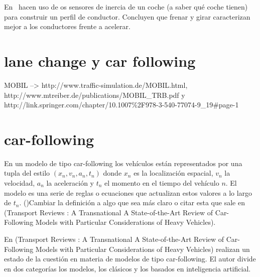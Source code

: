 En~\cite{van2013driver} hacen uso de os sensores de inercia de un coche (a saber qué coche tienen) para construir un perfil de conductor. Concluyen que frenar y girar caracterizan mejor a los conductores frente a acelerar.

\section{lane change y car following}

MOBIL --> http://www.traffic-simulation.de/MOBIL.html, http://www.mtreiber.de/publications/MOBIL\_TRB.pdf y http://link.springer.com/chapter/10.1007\%2F978-3-540-77074-9\_19\#page-1

\section{car-following}

En un modelo de tipo car-following los vehículos están representados por una tupla del estilo $(x_n, v_n, a_n, t_n)$ donde $x_n$ es la localización espacial, $v_n$ la velocidad, $a_n$ la aceleración y $t_n$ el momento en el tiempo del vehículo $n$. El modelo es una serie de reglas o ecuaciones que actualizan estos valores a lo largo de $t_n$. ()Cambiar la definición a algo que sea más claro o citar esta que sale en (Transport Reviews : A Transnational A State-of-the-Art Review of Car- Following Models with Particular Considerations of Heavy Vehicles).

En (Transport Reviews : A Transnational A State-of-the-Art Review of Car- Following Models with Particular Considerations of Heavy Vehicles) realizan un estado de la cuestión en materia de modelos de tipo car-following. El autor divide en dos categorías los modelos, los clásicos y los basados en inteligencia artificial.

